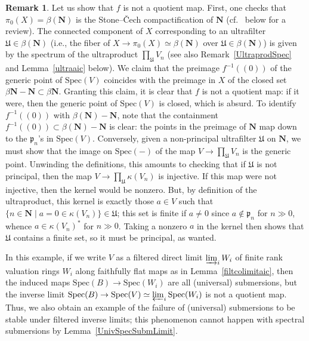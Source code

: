 \documentclass[reqno]{amsart}
\theoremstyle{definition}
\newtheorem{remark}[theorem]{Remark}
\begin{document}
\begin{remark}
Let us show that $f$ is not a quotient map. First, one checks that $\pi_0(X) = \beta
(\mathbf{N})$ is the Stone--\v{C}ech compactification of $\mathbf{N}$
(cf.~ below for a review). The
connected component of $X$ corresponding to an ultrafilter $\mathfrak{U} \in
\beta(\mathbf{N})$ (i.e., the fiber of $X \to \pi_0(X) \simeq
\beta(\mathbf{N})$ over $\mathfrak{U} \in \beta (\mathbf{N})$) is given by the
spectrum of the ultraproduct $\prod_{\mathfrak{U}} V_n$ (see also
Remark~\ref{UltraprodSpec} and Lemma~\ref{ultraaic} below). We claim that the
preimage $f^{-1}((0))$ of the generic point of $\mathrm{Spec}(V)$ coincides
with the preimage in $X$ of the closed set $\beta \mathbf{N} - \mathbf{N}
\subset \beta\mathbf{N}$. Granting this claim, it is clear that $f$ is not a
quotient map: if it were, then the generic point of $\mathrm{Spec}(V)$ is
closed, which is absurd. To identify $f^{-1}((0))$ with $\beta(\mathbf{N}) -
\mathbf{N}$, note that the containment $f^{-1}((0)) \subset \beta(\mathbf{N}) -
\mathbf{N}$ is clear: the points in the preimage of $\mathbf{N}$ map down to
the $\mathfrak{p}_n$'s in $\mathrm{Spec}(V)$. Conversely, given a non-principal
ultrafilter $\mathfrak{U}$ on $\mathbf{N}$, we must show that the image on
$\mathrm{Spec}(-)$ of the map $V \to \prod_{\mathfrak{U}} V_n$ is the generic
point. Unwinding the definitions, this amounts to checking that if $\mathfrak{U}$ is not principal, then the map $V \to \prod_{\mathfrak{U}} \kappa(V_n)$ is injective. If this map were not injective, then the kernel would be nonzero. But, by definition of the ultraproduct, this kernel is exactly those $a \in V$ such that $\{n \in \mathbf{N} \mid a = 0 \in \kappa(V_n) \} \in \mathfrak{U}$; this set is finite if $a \neq 0$ since $a \notin \mathfrak{p}_n$ for $n \gg 0$, whence $a \in \kappa(V_n)^*$ for $n \gg 0$. Taking a nonzero $a$ in the kernel then shows that $\mathfrak{U}$ contains a finite set, so it must be principal, as wanted.

In this example, if we write $V$ as a filtered direct limit $\varinjlim_i W_i$ of finite rank valuation rings $W_i$ along faithfully flat maps as in Lemma~\ref{filtcolimitaic}, then the induced maps $\mathrm{Spec}(B) \to \mathrm{Spec}(W_i)$ are all (universal) submersions, but the inverse limit $\mathrm{Spec}(B) \to \mathrm{Spec}(V) \simeq \varprojlim_i \mathrm{Spec}(W_i)$ is not a quotient map. Thus, we also obtain an example of the failure of (universal) submersions to be stable under filtered inverse limits; this phenomenon cannot happen with spectral submersions by Lemma~\ref{UnivSpecSubmLimit}.
\end{remark}
\end{document}
